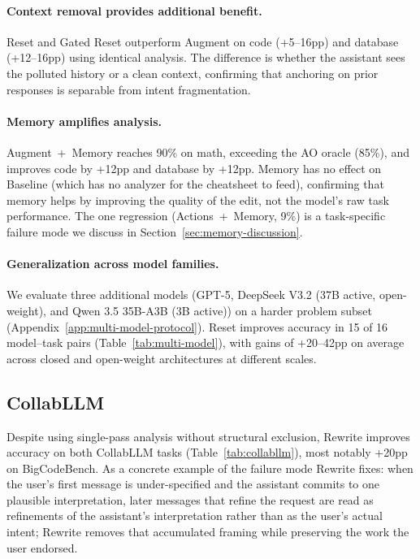 \documentclass{article}
\begin{document}
\paragraph{Context removal provides additional benefit.}
Reset and Gated Reset outperform Augment on code (+5--16pp) and database (+12--16pp) using identical analysis. The difference is whether the assistant sees the polluted history or a clean context, confirming that anchoring on prior responses is separable from intent fragmentation.

\paragraph{Memory amplifies analysis.}
Augment~+~Memory reaches 90\% on math, exceeding the AO oracle (85\%), and improves code by +12pp and database by +12pp. Memory has no effect on Baseline (which has no analyzer for the cheatsheet to feed), confirming that memory helps by improving the quality of the edit, not the model's raw task performance. The one regression (Actions~+~Memory, 9\%) is a task-specific failure mode we discuss in Section~\ref{sec:memory-discussion}.

\paragraph{Generalization across model families.}
\label{sec:multi-model}
We evaluate three additional models (GPT-5, DeepSeek V3.2 (37B active, open-weight), and Qwen 3.5 35B-A3B (3B active)) on a harder problem subset (Appendix~\ref{app:multi-model-protocol}). Reset improves accuracy in 15 of 16 model--task pairs (Table~\ref{tab:multi-model}), with gains of +20--42pp on average across closed and open-weight architectures at different scales.


\subsection{CollabLLM}
\label{sec:collab-results}

Despite using single-pass analysis without structural exclusion, Rewrite improves accuracy on both CollabLLM tasks (Table~\ref{tab:collabllm}), most notably +20pp on BigCodeBench. As a concrete example of the failure mode Rewrite fixes: when the user's first message is under-specified and the assistant commits to one plausible interpretation, later messages that refine the request are read as refinements of the assistant's interpretation rather than as the user's actual intent; Rewrite removes that accumulated framing while preserving the work the user endorsed.
\end{document}
